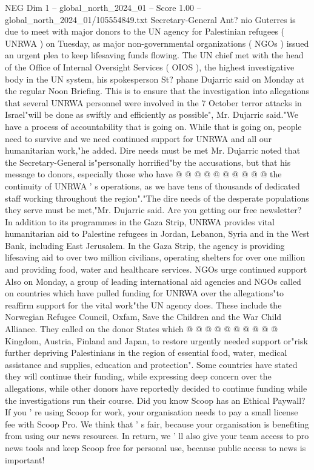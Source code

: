 \begin{textsample}{NEG Dim 1 – global\_north\_2024\_01 – Score 1.00 – global\_north\_2024\_01/105554849.txt}  \label{ex:f1_neg_328}
Secretary-General Ant? nio Guterres is due to meet with major donors to the UN agency for Palestinian refugees ( UNRWA ) on Tuesday, as major non-governmental organizations ( NGOs ) issued an urgent plea to keep lifesaving funds flowing.
The UN chief met with the head of the Office of Internal Oversight Services ( OIOS ), the highest investigative body in the UN system, his spokesperson St? phane Dujarric said on Monday at the regular Noon Briefing.
This is to ensure that the investigation into allegations that several UNRWA personnel were involved in the 7 October terror attacks in Israel"will be done as swiftly and efficiently as possible", Mr.
Dujarric said."We have a process of accountability that is going on.
While that is going on, people need to survive and we need continued support for UNRWA and all our humanitarian work,"he added.
Dire needs must be met Mr.
Dujarric noted that the Secretary-General is"personally horrified"by the accusations, but that his message to donors, especially those who have @ @ @ @ @ @ @ @ @ @ the continuity of UNRWA ' s operations, as we have tens of thousands of dedicated staff working throughout the region"."The dire needs of the desperate populations they serve must be met,"Mr.
Dujarric said.
Are you getting our free newsletter?
In addition to its programmes in the Gaza Strip, UNRWA provides vital humanitarian aid to Palestine refugees in Jordan, Lebanon, Syria and in the West Bank, including East Jerusalem.
In the Gaza Strip, the agency is providing lifesaving aid to over two million civilians, operating shelters for over one million and providing food, water and healthcare services.
NGOs urge continued support Also on Monday, a group of leading international aid agencies and NGOs called on countries which have pulled funding for UNRWA over the allegations"to reaffirm support for the vital work"the UN agency does.
These include the Norwegian Refugee Council, Oxfam, Save the Children and the War Child Alliance.
They called on the donor States which @ @ @ @ @ @ @ @ @ @ Kingdom, Austria, Finland and Japan, to restore urgently needed support or"risk further depriving Palestinians in the region of essential food, water, medical assistance and supplies, education and protection".
Some countries have stated they will continue their funding, while expressing deep concern over the allegations, while other donors have reportedly decided to continue funding while the investigations run their course.
Did you know Scoop has an Ethical Paywall?
If you ' re using Scoop for work, your organisation needs to pay a small license fee with Scoop Pro.
We think that ' s fair, because your organisation is benefiting from using our news resources.
In return, we ' ll also give your team access to pro news tools and keep Scoop free for personal use, because public access to news is important!

\end{textsample}
